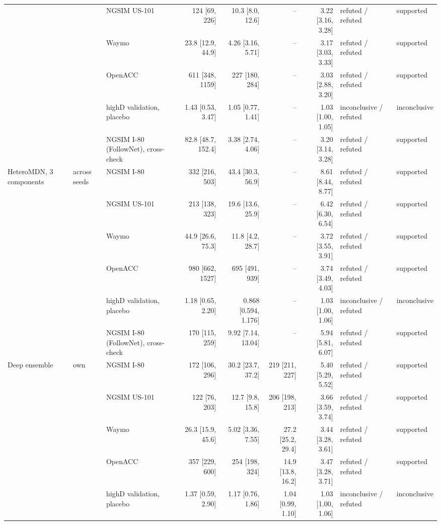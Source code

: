 \begin{longtable}{lllrrrrll}
 &  & NGSIM US-101 & 124 [69, 226] & 10.3 [8.0, 12.6] & -- & 3.22 [3.16, 3.28] & refuted / refuted & supported \\
 &  & Waymo & 23.8 [12.9, 44.9] & 4.26 [3.16, 5.71] & -- & 3.17 [3.03, 3.33] & refuted / refuted & supported \\
 &  & OpenACC & 611 [348, 1159] & 227 [180, 284] & -- & 3.03 [2.88, 3.20] & refuted / refuted & supported \\
 &  & highD validation, placebo & 1.43 [0.53, 3.47] & 1.05 [0.77, 1.41] & -- & 1.03 [1.00, 1.05] & inconclusive / refuted & inconclusive \\
 &  & NGSIM I-80 (FollowNet), cross-check & 82.8 [48.7, 152.4] & 3.38 [2.74, 4.06] & -- & 3.20 [3.14, 3.28] & refuted / refuted & supported \\
\midrule
HeteroMDN, 3 components & across seeds & NGSIM I-80 & 332 [216, 503] & 43.4 [30.3, 56.9] & -- & 8.61 [8.44, 8.77] & refuted / refuted & supported \\
 &  & NGSIM US-101 & 213 [138, 323] & 19.6 [13.6, 25.9] & -- & 6.42 [6.30, 6.54] & refuted / refuted & supported \\
 &  & Waymo & 44.9 [26.6, 75.3] & 11.8 [4.2, 28.7] & -- & 3.72 [3.55, 3.91] & refuted / refuted & supported \\
 &  & OpenACC & 980 [662, 1527] & 695 [491, 939] & -- & 3.74 [3.49, 4.03] & refuted / refuted & supported \\
 &  & highD validation, placebo & 1.18 [0.65, 2.20] & 0.868 [0.594, 1.176] & -- & 1.03 [1.00, 1.06] & inconclusive / refuted & inconclusive \\
 &  & NGSIM I-80 (FollowNet), cross-check & 170 [115, 259] & 9.92 [7.14, 13.04] & -- & 5.94 [5.81, 6.07] & refuted / refuted & supported \\
\midrule
Deep ensemble & own & NGSIM I-80 & 172 [106, 296] & 30.2 [23.7, 37.2] & 219 [211, 227] & 5.40 [5.29, 5.52] & refuted / refuted & supported \\
 &  & NGSIM US-101 & 122 [76, 203] & 12.7 [9.8, 15.8] & 206 [198, 213] & 3.66 [3.59, 3.74] & refuted / refuted & supported \\
 &  & Waymo & 26.3 [15.9, 45.6] & 5.02 [3.36, 7.55] & 27.2 [25.2, 29.4] & 3.44 [3.28, 3.61] & refuted / refuted & supported \\
 &  & OpenACC & 357 [229, 600] & 254 [198, 324] & 14.9 [13.8, 16.2] & 3.47 [3.28, 3.71] & refuted / refuted & supported \\
 &  & highD validation, placebo & 1.37 [0.59, 2.90] & 1.17 [0.76, 1.86] & 1.04 [0.99, 1.10] & 1.03 [1.00, 1.06] & inconclusive / refuted & inconclusive \\

\end{longtable}
